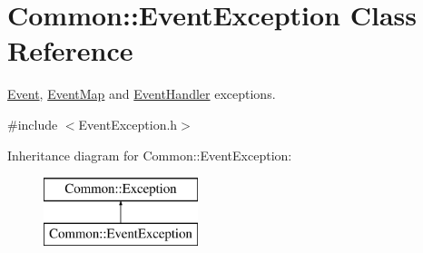 \hypertarget{class_common_1_1_event_exception}{\section{Common\-:\-:Event\-Exception Class Reference}
\label{class_common_1_1_event_exception}
}


\hyperlink{class_common_1_1_event}{Event}, \hyperlink{class_common_1_1_event_map}{Event\-Map} and \hyperlink{class_common_1_1_event_handler}{Event\-Handler} exceptions.  




{\ttfamily \#include $<$Event\-Exception.\-h$>$}

Inheritance diagram for Common\-:\-:Event\-Exception\-:\begin{figure}[H]
\begin{center}
\leavevmode
\includegraphics[height=2.000000cm]{class_common_1_1_event_exception}
\end{center}
\end{figure}
